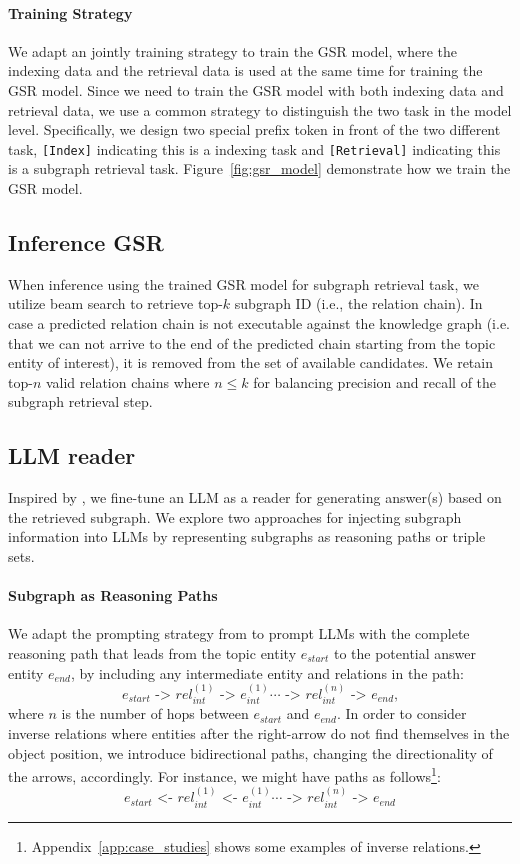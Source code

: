 \documentclass[11pt]{article}
\begin{document}
\paragraph{Training Strategy}
We adapt an jointly training strategy to train the GSR model, where the indexing data and the retrieval data is used at the same time for training the GSR model. Since we need to train the GSR model with both indexing data and retrieval data, we use a common strategy to distinguish the two task in the model level. Specifically, we design two special prefix token in front of the two different task, \texttt{[Index]} indicating this is a indexing task and \texttt{[Retrieval]} indicating this is a subgraph retrieval task. Figure~\ref{fig:gsr_model} demonstrate how we train the GSR model.
\subsection{Inference GSR}
When inference using the trained GSR model for subgraph retrieval task, we utilize beam search to retrieve top-$k$ subgraph ID (i.e., the relation chain).
In case a predicted relation chain is not executable against the knowledge graph (i.e. that we can not arrive to the end of the predicted chain starting from the topic entity of interest), it is removed from the set of available candidates. We retain top-$n$ valid relation chains where $n\leq k$ for balancing precision and recall of the subgraph retrieval step.
 



\subsection{LLM reader}

Inspired by \citet{luo2024reasoning}, we fine-tune an LLM as a reader for generating answer(s) based on the retrieved subgraph. We explore two approaches for injecting subgraph information into LLMs by representing subgraphs as reasoning paths or triple sets.

\paragraph{Subgraph as Reasoning Paths}
We adapt the prompting strategy from \citet{luo2024reasoning} to prompt LLMs with the complete reasoning path that leads from the topic entity $e_{start}$ to the potential answer entity $e_{end}$, by including any intermediate entity and relations in the path: 
$$e_{start} \text{ -> } rel_{int}^{(1)} \text{ -> } e_{int}^{(1)} \cdots \text{ -> } rel_{int}^{(n)} \text{ -> } e_{end}\text{,}$$
where $n$ is the number of hops between $e_{start}$ and $e_{end}$.
In order to consider inverse relations where entities after the right-arrow do not find themselves in the object position, we introduce bidirectional paths, changing the directionality of the arrows, accordingly. For instance, we might have paths as follows\footnote{Appendix~\ref{app:case_studies} shows some examples of inverse relations.}:
$$e_{start} \text{ <- } rel_{int}^{(1)} \text{ <- } e_{int}^{(1)} \cdots \text{ -> } rel_{int}^{(n)} \text{ -> } e_{end}$$
\end{document}
